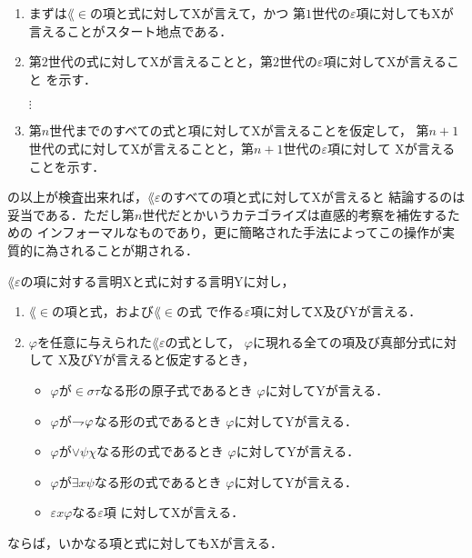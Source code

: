 	\begin{enumerate}
		\item まずは$\lang{\in}$の項と式に対してXが言えて，かつ
			第$1$世代の$\varepsilon$項に対してもXが言えることがスタート地点である．
		\item 第$2$世代の式に対してXが言えることと，第$2$世代の$\varepsilon$項に対してXが言えること
			を示す．
			
			$\vdots$
			
		\item 第$n$世代までのすべての式と項に対してXが言えることを仮定して，
			第$n+1$世代の式に対してXが言えることと，第$n+1$世代の$\varepsilon$項に対して
			Xが言えることを示す．
	\end{enumerate}
	の以上が検査出来れば，$\lang{\varepsilon}$のすべての項と式に対してXが言えると
	結論するのは妥当である．ただし第$n$世代だとかいうカテゴライズは直感的考察を補佐するための
	インフォーマルなものであり，更に簡略された手法によってこの操作が実質的に為されることが期される．
	
	\begin{screen}
		\begin{metaaxm}
			$\lang{\varepsilon}$の項に対する言明Xと式に対する言明Yに対し，
			\begin{enumerate}
				\item $\lang{\in}$の項と式，および$\lang{\in}$の式
					で作る$\varepsilon$項に対してX及びYが言える．
				\item $\varphi$を任意に与えられた$\lang{\varepsilon}$の式として，
					$\varphi$に現れる全ての項及び真部分式に対して
					X及びYが言えると仮定するとき，
					\begin{itemize}
						\item $\varphi$が$\in \sigma \tau$なる形の原子式であるとき
							$\varphi$に対してYが言える．
						\item $\varphi$が$\rightharpoondown\hspace{-0.25em} \varphi$なる形の式であるとき
							$\varphi$に対してYが言える．
						\item $\varphi$が$\vee \psi \chi$なる形の式であるとき
							$\varphi$に対してYが言える．
						\item $\varphi$が$\exists x \psi$なる形の式であるとき
							$\varphi$に対してYが言える．
						\item $\varepsilon x \varphi$なる$\varepsilon$項
							に対してXが言える．
					\end{itemize}
			\end{enumerate}
			ならば，いかなる項と式に対してもXが言える．
		\end{metaaxm}
	\end{screen}
	
